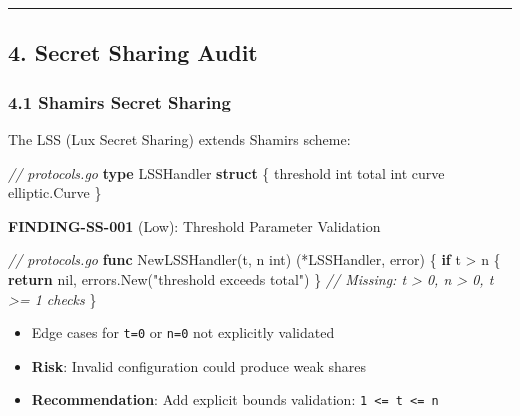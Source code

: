 \documentclass[
]{article}
\newenvironment{Shaded}{}{}
\newcommand{\CommentTok}[1]{\textcolor[rgb]{0.38,0.63,0.69}{\textit{#1}}}
\newcommand{\ControlFlowTok}[1]{\textcolor[rgb]{0.00,0.44,0.13}{\textbf{#1}}}
\newcommand{\DataTypeTok}[1]{\textcolor[rgb]{0.56,0.13,0.00}{#1}}
\newcommand{\KeywordTok}[1]{\textcolor[rgb]{0.00,0.44,0.13}{\textbf{#1}}}
\newcommand{\NormalTok}[1]{#1}
\newcommand{\OperatorTok}[1]{\textcolor[rgb]{0.40,0.40,0.40}{#1}}
\newcommand{\OtherTok}[1]{\textcolor[rgb]{0.00,0.44,0.13}{#1}}
\newcommand{\StringTok}[1]{\textcolor[rgb]{0.25,0.44,0.63}{#1}}
\providecommand{\tightlist}{%
  \setlength{\itemsep}{0pt}\setlength{\parskip}{0pt}}
\begin{document}
\begin{center}\rule{0.5\linewidth}{0.5pt}\end{center}

\subsection{4. Secret Sharing Audit}\label{4-secret-sharing-audit}

\subsubsection{4.1 Shamir\textquotesingle s Secret
Sharing}\label{41-shamirs-secret-sharing}

The LSS (Lux Secret Sharing) extends Shamir\textquotesingle s scheme:

\begin{Shaded}
\begin{Highlighting}[]
\CommentTok{// protocols.go}
\KeywordTok{type}\NormalTok{ LSSHandler }\KeywordTok{struct} \OperatorTok{\{}
\NormalTok{    threshold }\DataTypeTok{int}
\NormalTok{    total     }\DataTypeTok{int}
\NormalTok{    curve     elliptic}\OperatorTok{.}\NormalTok{Curve}
\OperatorTok{\}}
\end{Highlighting}
\end{Shaded}

\textbf{FINDING-SS-001} (Low): Threshold Parameter Validation

\begin{Shaded}
\begin{Highlighting}[]
\CommentTok{// protocols.go}
\KeywordTok{func}\NormalTok{ NewLSSHandler}\OperatorTok{(}\NormalTok{t}\OperatorTok{,}\NormalTok{ n }\DataTypeTok{int}\OperatorTok{)} \OperatorTok{(*}\NormalTok{LSSHandler}\OperatorTok{,} \DataTypeTok{error}\OperatorTok{)} \OperatorTok{\{}
    \ControlFlowTok{if}\NormalTok{ t }\OperatorTok{\textgreater{}}\NormalTok{ n }\OperatorTok{\{}
        \ControlFlowTok{return} \OtherTok{nil}\OperatorTok{,}\NormalTok{ errors}\OperatorTok{.}\NormalTok{New}\OperatorTok{(}\StringTok{"threshold exceeds total"}\OperatorTok{)}
    \OperatorTok{\}}
    \CommentTok{// Missing: t \textgreater{} 0, n \textgreater{} 0, t \textgreater{}= 1 checks}
\OperatorTok{\}}
\end{Highlighting}
\end{Shaded}

\begin{itemize}
\tightlist
\item
  Edge cases for \texttt{t=0} or \texttt{n=0} not explicitly validated
\item
  \textbf{Risk}: Invalid configuration could produce weak shares
\item
  \textbf{Recommendation}: Add explicit bounds validation:
  \texttt{1\ \textless{}=\ t\ \textless{}=\ n}
\end{itemize}
\end{document}
